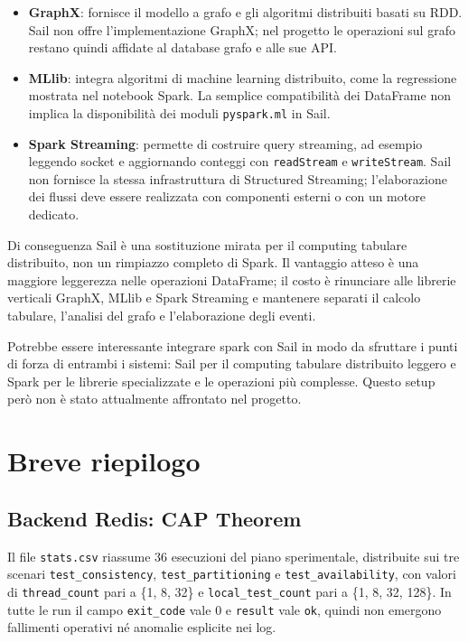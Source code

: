 \documentclass{article}
\begin{document}
\begin{itemize}
    \item \textbf{GraphX}: fornisce il modello a grafo e gli algoritmi %
    distribuiti basati su RDD. Sail non offre l'implementazione GraphX; %
    nel progetto le operazioni sul grafo restano quindi affidate al database grafo e alle sue API.
    \item \textbf{MLlib}: integra algoritmi di machine learning distribuito, %
    come la regressione mostrata nel notebook Spark. %
    La semplice compatibilità dei DataFrame non implica la disponibilità dei moduli \texttt{pyspark.ml} in Sail.
    \item \textbf{Spark Streaming}: permette di costruire query streaming, ad %
    esempio leggendo socket e aggiornando conteggi con %
    \texttt{readStream} e \texttt{writeStream}. Sail non fornisce la stessa infrastruttura di Structured Streaming; %
    l'elaborazione dei flussi deve essere realizzata con componenti esterni o con un motore dedicato.
\end{itemize}

Di conseguenza Sail è una sostituzione mirata per il computing tabulare distribuito, %
non un rimpiazzo completo di Spark. %
Il vantaggio atteso è una maggiore leggerezza nelle operazioni %
DataFrame; il costo è rinunciare alle librerie verticali %
GraphX, MLlib e Spark Streaming e mantenere separati il %
calcolo tabulare, l'analisi del grafo e l'elaborazione degli eventi.


Potrebbe essere interessante integrare spark con Sail in modo da sfruttare i punti di forza di entrambi i sistemi: %
Sail per il computing tabulare distribuito leggero e Spark per le librerie specializzate e le operazioni più complesse.
Questo setup però non è stato attualmente affrontato nel progetto.



%

\section{Breve riepilogo}

\subsection{Backend Redis: CAP Theorem}
Il file \texttt{stats.csv} riassume 36 esecuzioni del piano sperimentale, distribuite sui tre scenari %
\texttt{test\_consistency}, \texttt{test\_partitioning} e \texttt{test\_availability}, con valori di %
\texttt{thread\_count} pari a \{1, 8, 32\} e \texttt{local\_test\_count} pari a \{1, 8, 32, 128\}. In %
tutte le run il campo \texttt{exit\_code} vale 0 e \texttt{result} vale \texttt{ok}, quindi non emergono %
fallimenti operativi né anomalie esplicite nei log.
\end{document}
